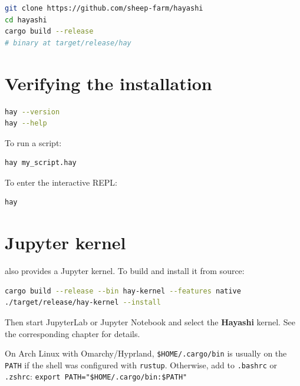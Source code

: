 \begin{lstlisting}[style=inline, language=sh]
git clone https://github.com/sheep-farm/hayashi
cd hayashi
cargo build --release
# binary at target/release/hay
\end{lstlisting}

\section{Verifying the installation}

\begin{lstlisting}[style=inline, language=sh]
hay --version
hay --help
\end{lstlisting}

To run a script:

\begin{lstlisting}[style=inline, language=sh]
hay my_script.hay
\end{lstlisting}

To enter the interactive REPL:

\begin{lstlisting}[style=inline, language=sh]
hay
\end{lstlisting}

\section{Jupyter kernel}

\hayashi{} also provides a Jupyter kernel. To build and install it from source:

\begin{lstlisting}[style=inline, language=sh]
cargo build --release --bin hay-kernel --features native
./target/release/hay-kernel --install
\end{lstlisting}

Then start JupyterLab or Jupyter Notebook and select the \textbf{Hayashi}
kernel. See the corresponding chapter for details.

\begin{nota}
  On Arch Linux with Omarchy/Hyprland, \texttt{\$HOME/.cargo/bin} is
  usually on the \texttt{PATH} if the shell was configured with
  \texttt{rustup}. Otherwise, add to \texttt{.bashrc} or \texttt{.zshrc}:
  \texttt{export PATH="\$HOME/.cargo/bin:\$PATH"}
\end{nota}
